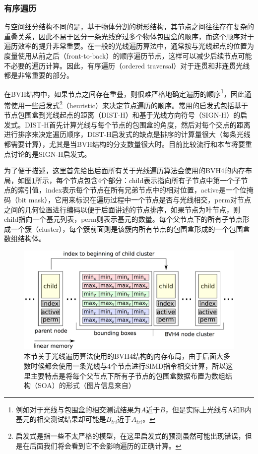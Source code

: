 \subsubsection{有序遍历}
与空间细分结构不同的是，基于物体分割的树形结构，其节点之间往往存在复杂的重叠关系，因此不易于区分一条光线穿过多个物体包围盒的顺序，而这个顺序对于遍历效率的提升非常重要。在一般的光线遍历算法中，通常按与光线起点的位置为度量使用从前之后（front-to-back）的顺序遍历节点，这样可以减少后续节点可能不必要的遍历计算。因此，有序遍历（ordered traversal）对于连贯和非连贯光线都是非常重要的部分。

在BVH结构中，如果节点之间存在重叠，则很难严格地确定遍历的顺序\footnote{例如对于光线与包围盒的相交测试结果为$A$近于$B$，但是实际上光线与A和B内基元的相交测试结果却可能是$B_{tri}$近于$A_{tri}$。}，因此通常使用一些启发式\footnote{启发式是指一些不太严格的模型，在这里启发式的预测虽然可能出现错误，但是在后面我们将会看到它不会影响遍历的正确计算。}（heuristic）来决定节点遍历的顺序。常用的启发式包括基于节点包围盒到光线起点的距离（DIST-H）和基于光线方向符号（SIGN-H）的启发式。DIST-H首先计算光线与每个节点的包围盒的角度，然后对每个交点的距离进行排序来决定遍历顺序，DIST-H启发式的缺点是排序的计算量很大（每条光线都需要计算），尤其是当BVH结构的分支数量很大时。目前比较流行和本节将要重点讨论的是SIGN-H启发式。

为了便于描述，这里首先给出后面所有关于光线遍历算法会使用的BVH4的内存布局\cite{a:EfficientRayTracingKernelsforModernCPUArchitectures}，如图\ref{f:pt-bvh4}所示，每个节点包含4个部分：child表示指向所有子节点中第一个子节点的索引值，index表示每个节点在所有兄弟节点中的相对位置，active是一个位掩码（bit mask），它用来标识在遍历过程中一个节点是否与光线相交，perm对节点之间的几何位置进行编码以便于后面讲述的节点排序，如果节点为叶节点，则child指向一个基元列表，perm则表示基元的数量。每个父节点下的所有子节点形成一个簇（cluster），每个簇前面则是该簇内所有节点的包围盒形成的一个包围盒数组结构体。

\begin{figure}
	\includegraphics[width=1.\textwidth]{figures/pt/bvh4}
	\caption{本节关于光线遍历算法使用的BVH4结构的内存布局，由于后面大多数时候都会使用一条光线与4个节点进行SIMD指令相交计算，所以这里主要特点是将每个父节点下所有子节点的包围盒数据布置为数组结构（SOA）的形式（图片信息来自\cite{a:EfficientRayTracingKernelsforModernCPUArchitectures}）}
	\label{f:pt-bvh4}
\end{figure}

